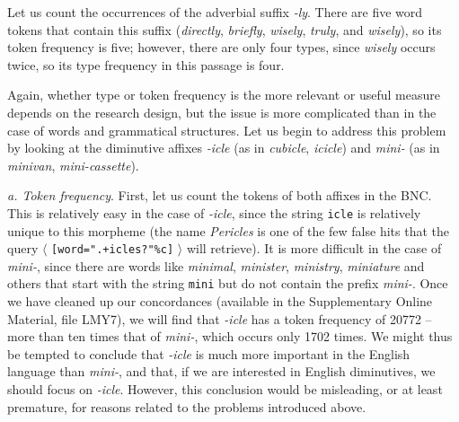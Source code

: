 Let us count the occurrences of the adverbial  suffix  \textit{-ly}. There are five word tokens  that contain this suffix  (\textit{directly}, \textit{briefly}, \textit{wisely}, \textit{truly}, and \textit{wisely}), so its token frequency  is five; however, there are only four types,  since \textit{wisely} occurs twice, so its type frequency  in this passage is four.

Again, whether type  or token  frequency  is the more relevant or useful measure  depends on the research design,  but the issue is more complicated than in the case of words and grammatical  structures. Let us begin to address this problem by looking at the diminutive affixes  \textit{-icle} (as in \textit{cubicle}, \textit{icicle}) and \textit{mini-} (as in \textit{minivan}, \textit{mini\hyp{}cassette}).

\textit{a. Token frequency}. First, let us count the tokens  of both affixes  in the BNC.  This is relatively easy in the case of \textit{-icle}, since the string \texttt{icle} is relatively unique to this morpheme  (the name \textit{Pericles} is one of the few false hits that the query $\langle$ \texttt{[word=".+icles?"\%c]} $\rangle$ will retrieve).  It is more difficult in the case of \textit{mini-}, since there are words like \textit{minimal}, \textit{minister}, \textit{ministry}, \textit{miniature} and others that start with the string \texttt{mini} but do not contain the prefix  \textit{mini-}. Once we have cleaned up our concordances  (available in the Supplementary Online Material, file LMY7), we will find that \textit{-icle} has a token frequency  of \num{20772} -- more than ten times that of \textit{mini-}, which occurs only \num{1702} times. We might thus be tempted to conclude that \textit{-icle} is much more important in the English language than \textit{mini-}, and that, if we are interested in English diminutives, we should focus on \textit{-icle}. However, this conclusion would be misleading, or at least premature, for reasons related to the problems introduced above.

